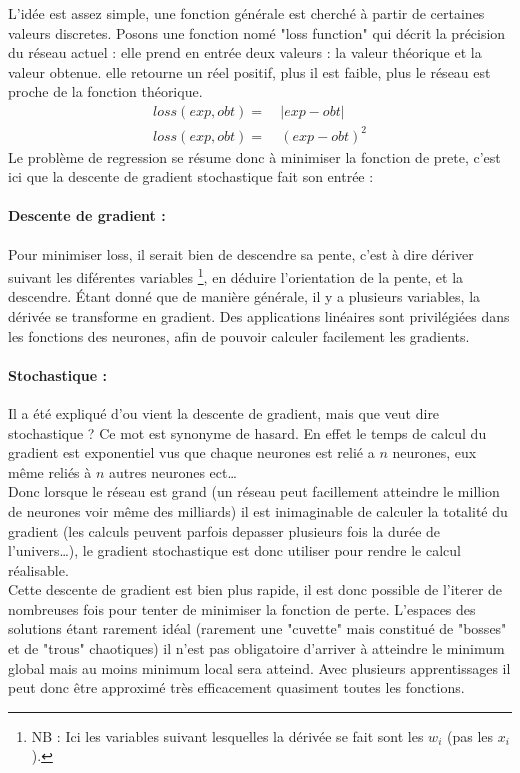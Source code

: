 L'idée est assez simple, une fonction générale est cherché à partir de certaines valeurs discretes.
Posons une fonction nomé "loss function" qui décrit la précision du réseau actuel :
elle prend en entrée deux valeurs : la valeur théorique et la valeur obtenue.
elle retourne un réel positif, plus il est faible, plus le réseau est proche de la fonction théorique.
\exemle
{
\begin{align*}
    loss(exp, obt) = &\ |exp - obt| \\
    loss(exp, obt) = &\ (exp - obt)^2
\end{align*}
}
Le problème de regression se résume donc à minimiser la fonction de prete,
c'est ici que la descente de gradient stochastique fait son entrée :


\paragraph{Descente de gradient :}
Pour minimiser loss, il serait bien de descendre sa pente, c'est à dire dériver suivant les diférentes variables
\footnote{\textsc{NB :} Ici les variables suivant lesquelles la dérivée se fait sont les $w_i$ (pas les $x_i$).},
en déduire l'orientation de la pente, et la descendre.
Étant donné que de manière générale, il y a plusieurs variables, la dérivée se transforme en gradient.
Des applications linéaires sont privilégiées dans les fonctions des neurones,
afin de pouvoir calculer facilement les gradients.\\


\paragraph{Stochastique :}
Il a été expliqué d'ou vient la descente de gradient, mais que veut dire stochastique ?
Ce mot est synonyme de hasard.
En effet le temps de calcul du gradient est exponentiel vus que chaque neurones est relié a $n$ neurones,
eux même reliés à $n$ autres neurones ect\ldots\\
Donc lorsque le réseau est grand
(un réseau peut facillement atteindre le million de neurones voir même des milliards\cite{i3espectrum})
il est inimaginable de calculer la totalité du gradient (les calculs peuvent parfois depasser
plusieurs fois la durée de l'univers\ldots),
le gradient stochastique est donc utiliser pour rendre le calcul réalisable.\\


Cette descente de gradient est bien plus rapide, il est donc possible de l'iterer de nombreuses fois
pour tenter de minimiser la fonction de perte.
L'espaces des solutions étant rarement idéal
(rarement une "cuvette" mais constitué de "bosses" et de "trous" chaotiques)
il n'est pas obligatoire d'arriver à atteindre le minimum global mais au moins minimum local sera atteind.
Avec plusieurs apprentissages il peut donc être approximé très efficacement quasiment toutes les fonctions.

